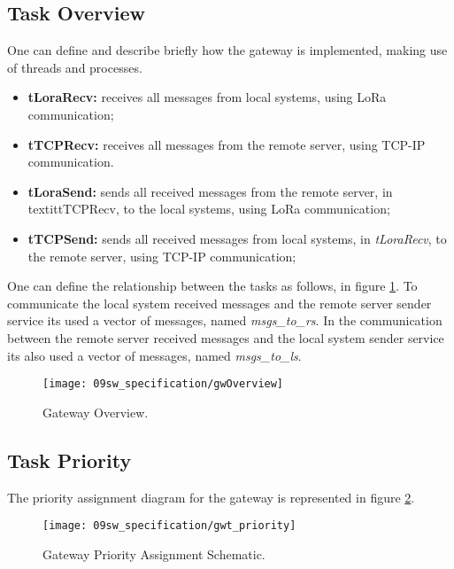\subsection{Task Overview}
One can define and describe briefly how the gateway is implemented, making use of threads and processes.

\begin{itemize}
	\item \textbf{tLoraRecv: } receives all messages from local systems, using LoRa communication;
	\item \textbf{tTCPRecv: } receives all messages from the remote server, using TCP-IP communication.	
	\item \textbf{tLoraSend: } sends all received messages from the remote server, in textit{tTCPRecv}, to the local systems, using LoRa communication;
	\item \textbf{tTCPSend: } sends all received messages from local systems, in \textit{tLoraRecv}, to the remote server, using TCP-IP communication;
\end{itemize}

One can define the relationship between the tasks as follows, in figure \ref{fig:gwOverview}. To communicate the local system received messages and the remote server sender service its used a vector of messages, named \textit{msgs\_to\_rs}. In the communication between the remote server received messages and the local system sender service its also used a vector of messages, named \textit{msgs\_to\_ls}.

\begin{figure}[H]
	\centering
	\texttt{[image: 09sw\_specification/gwOverview]}
	\caption{Gateway Overview.}
	\label{fig:gwOverview}
\end{figure}

\subsection{Task Priority}
The priority assignment diagram for the gateway is represented in figure \ref{fig:gwt_priority}.

\begin{figure}[H]
	\centering
	\texttt{[image: 09sw\_specification/gwt\_priority]}
	\caption{Gateway Priority Assignment Schematic.}
	\label{fig:gwt_priority}
\end{figure}

